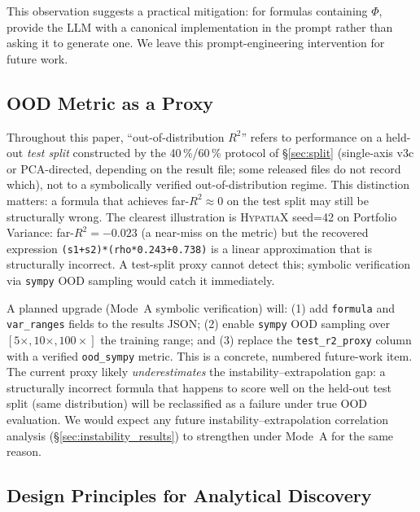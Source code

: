 \documentclass[twoside,11pt]{article}
\newcommand{\Rsq}{R^{2}}
\begin{document}
This observation suggests a practical mitigation: for formulas containing $\Phi$,
provide the LLM with a canonical implementation in the prompt rather than asking it
to generate one.  We leave this prompt-engineering intervention for future work.

\subsection{OOD Metric as a Proxy}\label{subsec:ood-metric-as-a-proxy}
\label{sec:ood_proxy}

Throughout this paper, ``out-of-distribution $\Rsq$'' refers to performance on a
held-out \emph{test split} constructed by the 40\,\%/60\,\% protocol of
\S\ref{sec:split} (single-axis v3c or PCA-directed, depending on the result
file; some released files do not record which), not to a
symbolically verified out-of-distribution regime.  This distinction matters: a
formula that achieves far-$\Rsq \approx 0$ on the test split may still be
structurally wrong.  The clearest illustration is \textsc{HypatiaX} seed=42 on
Portfolio Variance: far-$\Rsq = -0.023$ (a near-miss on the metric) but the
recovered expression \texttt{(s1+s2)*(rho*0.243+0.738)} is a linear approximation
that is structurally incorrect.  A test-split proxy cannot detect this; symbolic
verification via \texttt{sympy} OOD sampling would catch it immediately.

A planned upgrade (Mode~A symbolic verification) will: (1) add \texttt{formula} and
\texttt{var\_ranges} fields to the results JSON; (2) enable \texttt{sympy} OOD
sampling over $[5\times, 10\times, 100\times]$ the training range; and (3) replace
the \texttt{test\_r2\_proxy} column with a verified \texttt{ood\_sympy} metric.
This is a concrete, numbered future-work item.  The current proxy likely
\emph{underestimates} the instability--extrapolation gap: a structurally incorrect
formula that happens to score well on the held-out test split (same distribution)
will be reclassified as a failure under true OOD evaluation. We would expect any
future instability--extrapolation correlation analysis (\S\ref{sec:instability_results})
to strengthen under Mode~A for the same reason.

\subsection{Design Principles for Analytical Discovery}\label{subsec:design-principles-for-analytical-discove}
\label{sec:disc_principles}
\end{document}
